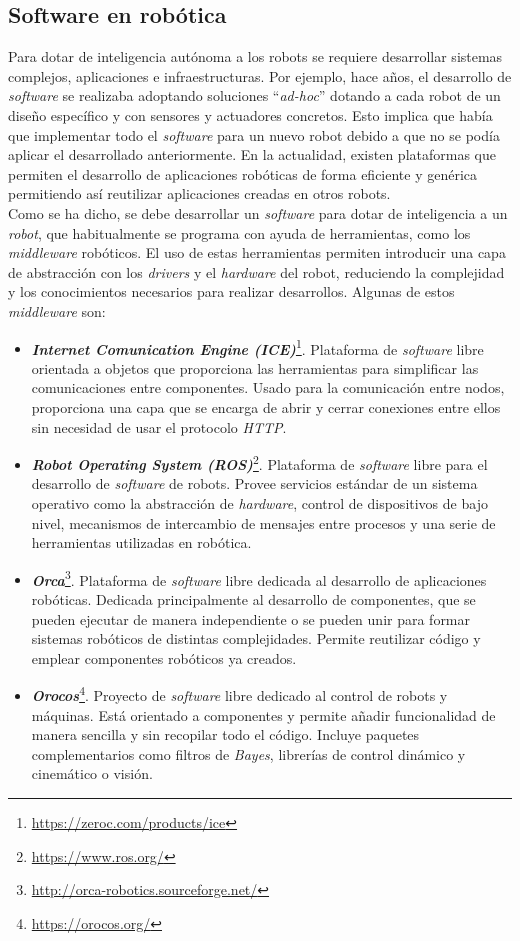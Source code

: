 \subsection{Software en robótica}
\label{subsec:softwarerobot}
Para dotar de inteligencia autónoma a los robots se requiere desarrollar sistemas  complejos, aplicaciones e infraestructuras. Por ejemplo, hace años, el desarrollo de \textit{software} se realizaba adoptando soluciones ``\textit{ad-hoc}'' dotando a cada robot de un diseño específico y con sensores y actuadores concretos. Esto implica que había que implementar todo el \textit{software} para un nuevo robot debido a que no se podía aplicar el desarrollado anteriormente. En la actualidad, existen plataformas que permiten el desarrollo de aplicaciones robóticas de forma eficiente y genérica permitiendo así reutilizar aplicaciones creadas en otros robots. \\  


Como se ha dicho, se debe desarrollar un \textit{software} para dotar de inteligencia a un \textit{robot}, que habitualmente se programa con ayuda de herramientas, como los \textit{middleware} robóticos. El uso de estas herramientas permiten introducir una capa de abstracción con los \textit{drivers} y el \textit{hardware} del robot, reduciendo la complejidad y los conocimientos necesarios para realizar desarrollos. Algunas de estos \textit{middleware} son: 
\begin{itemize}
    \item  \textit{\textbf{Internet Comunication Engine (ICE)}}\footnote{\url{https://zeroc.com/products/ice}}. Plataforma de \textit{software} libre orientada a objetos que proporciona las herramientas para simplificar las comunicaciones entre componentes. Usado para la comunicación entre nodos, proporciona una capa que se encarga de abrir y cerrar conexiones entre ellos sin necesidad de usar el protocolo \textit{HTTP}. 
    \item \textit{\textbf{Robot Operating System (ROS)}}\footnote{\url{https://www.ros.org/}}. Plataforma de \textit{software} libre para el desarrollo de \textit{software} de robots. Provee servicios estándar de un sistema operativo como la abstracción de \textit{hardware}, control de dispositivos de bajo nivel, mecanismos de intercambio de mensajes entre procesos y una serie de herramientas utilizadas en robótica. 
    \item \textit{\textbf{Orca}}\footnote{\url{http://orca-robotics.sourceforge.net/}}. Plataforma de \textit{software} libre dedicada al desarrollo de aplicaciones robóticas. Dedicada principalmente al desarrollo de componentes, que se pueden ejecutar de manera independiente o se pueden unir para formar sistemas robóticos de distintas complejidades. Permite reutilizar código y emplear componentes robóticos ya creados.
     \item \textit{\textbf{Orocos}}\footnote{\url{https://orocos.org/}}. Proyecto de \textit{software} libre dedicado al control de robots y máquinas. Está orientado a componentes y permite añadir funcionalidad de manera sencilla y sin recopilar todo el código. Incluye paquetes complementarios como filtros de \textit{Bayes}, librerías de control dinámico y cinemático o visión.
\end{itemize}

